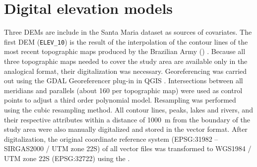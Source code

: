 
\tocless\section{Digital elevation models}
\label{sec:covar-data-dem}

Three DEMs are include in the Santa Maria dataset as sources of covariates. The first DEM 
(\texttt{ELEV\_10}) is the result of the interpolation of the contour lines of the most recent 
topographic maps produced by the Brazilian Army () \cite{DSG1980, DSG1992, DSG1992a}. 
Because all three topographic maps needed to cover the study area are available only in the 
analogical format, their digitalization was necessary. Georeferencing was carried out using the GDAL 
Georeferencer plug-in in QGIS \cite{GDAL2013, QGIS2013}. Intersections between all meridians and 
parallels (about \num{160} per topographic map) were used as control points to adjust a third order 
polynomial model. Resampling was performed using the cubic resampling method. All contour lines, 
peaks, lakes and rivers, and their respective attributes within a distance of \SI{1000}{\metre} 
from the boundary of the study area were also manually digitalized and stored in the vector format. 
After digitalization, the original coordinate reference system (EPSG:31982 -- SIRGAS2000 / UTM 
zone 22S) of all vector files was transformed to WGS1984 / UTM zone 22S (EPSG:32722) using the 
 \cite{BivandEtAl2013a}.


